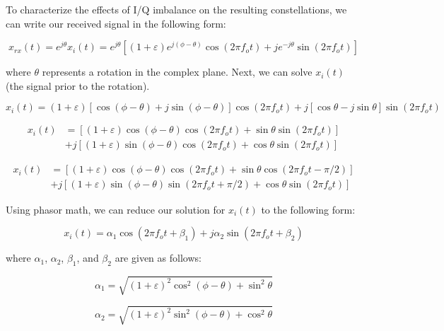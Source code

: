 \documentclass{article}
\begin{document}
To characterize the effects of I/Q imbalance on the resulting constellations, we can write our received signal in the following form:

\begin{equation}
	x_{rx}(t) = e^{j\theta}x_i(t) = e^{j\theta}\left[(1+\varepsilon)e^{j(\phi-\theta)}\cos(2{\pi}f_ot)+je^{-j\theta}\sin(2{\pi}f_ot)\right]
\end{equation}

where $\theta$ represents a rotation in the complex plane. Next, we can solve $x_i(t)$ (the signal prior to the rotation).

\begin{equation}
	x_i(t) = (1+\varepsilon)[\cos(\phi-\theta)+j\sin(\phi-\theta)]\cos(2{\pi}f_ot)+j[\cos\theta-j\sin\theta]\sin(2{\pi}f_ot)
\end{equation}

\begin{equation}
\begin{split}
	x_i(t) &= \left[(1+\varepsilon)\cos(\phi-\theta)\cos(2{\pi}f_ot)+\sin\theta\sin(2{\pi}f_ot)\right]\\
	&+j\left[(1+\varepsilon)\sin(\phi-\theta)\cos(2{\pi}f_ot)+\cos\theta\sin(2{\pi}f_ot)\right]
\end{split}
\end{equation}

\begin{equation}
\begin{split}
	x_i(t) &= \left[(1+\varepsilon)\cos(\phi-\theta)\cos(2{\pi}f_ot)+\sin\theta\cos(2{\pi}f_ot-\pi/2)\right]\\
	&+j\left[(1+\varepsilon)\sin(\phi-\theta)\sin(2{\pi}f_ot+\pi/2)+\cos\theta\sin(2{\pi}f_ot)\right]
\end{split}
\end{equation}

Using phasor math, we can reduce our solution for $x_i(t)$ to the following form:

\begin{equation}
	x_i(t) = \alpha_1\cos(2{\pi}f_ot+\beta_1)+j\alpha_2\sin(2{\pi}f_ot+\beta_2)
\end{equation}

where $\alpha_1$, $\alpha_2$, $\beta_1$, and $\beta_2$ are given as follows:

\begin{equation}
	\alpha_1 = \sqrt{(1+\varepsilon)^2\cos^2(\phi-\theta)+\sin^2\theta}
\end{equation}

\begin{equation}
	\alpha_2 = \sqrt{(1+\varepsilon)^2\sin^2(\phi-\theta)+\cos^2\theta}
\end{equation}
\end{document}
